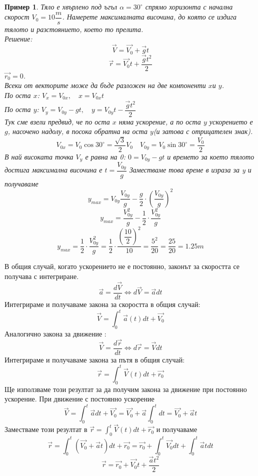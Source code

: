 \documentclass[fleqn]{article}
\newtheorem{example}{Пример}[subsection]
\begin{document}
\begin{example}
Тяло е хвърлено под ъгъл $\alpha = 30^\circ $ спрямо хоризонта с начална скорост 
$V_0 = 10 \dfrac{m}{s}$. Намерете максималната височина, до която се издига тялото и разстоянието, което то прелита. \\
Решение: \\
$$\vec{V} = \vec{V_0} + \vec{g}t$$
$$\vec{r} = \vec{V_0}t + \dfrac{\vec{g}t^2}{2}$$
$\vec{r_0} = 0$. \\
Всеки от векторите може да бъде разложен на две компоненти $x$и $y$. \\
По оста $x$: $V_x = V_{0x}, \quad x = V_{0x}t$ \\
По оста $y$: $V_y = V_{0y} - gt, \quad y = V_{0y}t - \dfrac{\vec{g}t^2}{2}$ \\
Тук сме взели предвид, че по оста $x$ няма ускорение, а по оста $y$ ускорението е $g$, насочено надолу, в посока обратна на оста $y$(и затова с отрицателен знак). \\
$$V_{0x} = V_0 \cos{30^\circ} = \dfrac{\sqrt{3}}{2}V_0 \quad V_{0y} = V_0 \sin{30^\circ} = \dfrac{V_0}{2}$$
В най високата точка $V_y$ е равна на 0: $0 = V_{0y} - gt$ и времето за което тялото достига максимална височина е $t = \dfrac{V_{0y}}{g}$
Заместваме това време в израза за y и получаваме 
$$y_{max} = V_{0y} \dfrac{V_{0y}}{g} - \dfrac{g}{2} \cdot \left(  \dfrac{V_{0y}}{g} \right)^2 $$
$$y_{max} = \dfrac{V_{0y}^2}{g} - \dfrac{1}{2} \cdot \dfrac{V_{0y}^2}{g}$$ 
$$y_{max} = \dfrac{1}{2} \cdot \dfrac{V_{0y}^2}{g} =  \dfrac{1}{2} \cdot \dfrac{\left( \dfrac{10}{2} \right)^2}{10} = \dfrac{5^2}{20} = \dfrac{25}{20} = 1.25m$$
\end{example}

В общия случай, когато ускорението не е постоянно, законът за скоростта се получава с интегриране. 
$$\vec{a} =  \dfrac{d\vec{V}}{dt} \Leftrightarrow d\vec{V} = \vec{a}dt$$
Интегрираме и получаваме закона за скоростта в общия случай: 
$$\vec{V} = \int _0 ^ t  \vec{a}(t)dt + \vec{V_0}$$
Аналогично закона за движение : 
$$\vec{V} =  \dfrac{d\vec{r}}{dt} \Leftrightarrow d\vec{r} = \vec{V}dt$$
Интегрираме и получаваме закона за пътя в общия случай:
$$\vec{r} = \int _0 ^ t  \vec{V}(t)dt + \vec{r_0}$$
Ще използваме този резултат за да получим закона за движение при постоянно ускорение. При движение с постоянно ускорение  
$$\vec{V} = \int _0 ^ t  \vec{a}dt + \vec{V_0} = \vec{V_0} + \vec{a} \int _0 ^ t dt = \vec{V_0} + \vec{a}t$$
Заместваме този резултат в $\vec{r} = \int _0 ^ t  \vec{V}(t)dt + \vec{r_0}$ и получаваме 
$$\vec{r} = \int _0 ^ t (\vec{V_0} + \vec{a}t) dt + \vec{r_0} = \vec{r_0} + \int _0 ^ t \vec{V_0} dt + \int _0 ^ t \vec{a}t dt$$
$$ \vec{r} = \vec{r_0} + \vec{V_0}t +\dfrac{\vec{a}t^2}{2} $$
\end{document}
